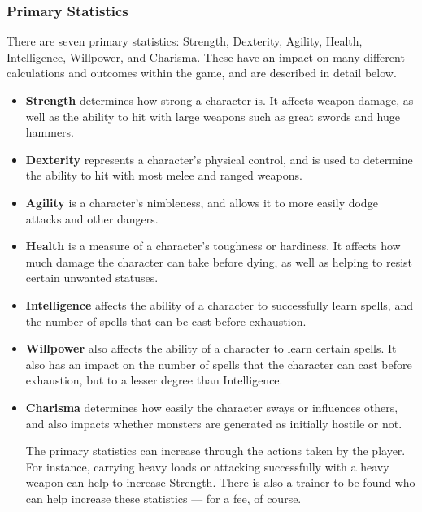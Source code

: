 \subsubsection{Primary Statistics}

There are seven primary statistics: Strength, Dexterity, Agility, Health,
Intelligence, Willpower, and Charisma.  These have an impact on many
different calculations and outcomes within the game, and are described
in detail below.

\begin{itemize}
\item {\bf Strength} determines how strong a character is.  It affects
weapon damage, as well as the ability to hit with large weapons such as
great swords and huge hammers.

\item {\bf Dexterity} represents a character's physical control, and is
used to determine the ability to hit with most melee and ranged weapons.

\item {\bf Agility} is a character's nimbleness, and allows it to more
easily dodge attacks and other dangers.

\item {\bf Health} is a measure of a character's toughness or hardiness.
It affects how much damage the character can take before dying, as well
as helping to resist certain unwanted statuses.

\item {\bf Intelligence} affects the ability of a character to successfully
learn spells, and the number of spells that can be cast before exhaustion.

\item {\bf Willpower} also affects the ability of a character to learn
certain spells.  It also has an impact on the number of spells that the
character can cast before exhaustion, but to a lesser degree than
Intelligence.

\item {\bf Charisma} determines how easily the character sways or
influences others, and also impacts whether monsters are generated as
initially hostile or not.

The primary statistics can increase through the actions taken by the
player.  For instance, carrying heavy loads or attacking successfully with
a heavy weapon can help to increase Strength.  There is also a trainer
to be found who can help increase these statistics --- for a fee, of
course.

\end{itemize}
